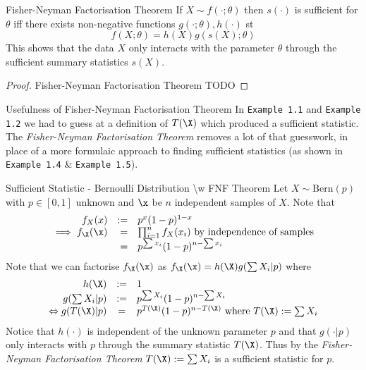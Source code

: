 \documentclass[11pt,a4paper]{article}
\begin{document}
  \begin{theorem}{Fisher-Neyman Factorisation Theorem}
    If $X\sim f(\cdot;\theta)$ then $s(\cdot)$ is sufficient for $\theta$ iff there exists non-negative functions $g(\cdot;\theta),h(\cdot)$ st
    \[ f(X;\theta)=h(X)g(s(X);\theta) \]
    This shows that the data $X$ only interacts with the parameter $\theta$ through the sufficient summary statistics $s(X)$.
  \end{theorem}

  \begin{proof}{Fisher-Neyman Factorisation Theorem}
    TODO
  \end{proof}

  \begin{remark}{Usefulness of Fisher-Neyman Factorisation Theorem}
    In \texttt{Example 1.1}  and \texttt{Example 1.2} we had to guess at a definition of $T(\X)$ which produced a sufficient statistic. The \textit{Fisher-Neyman Factorisation Theorem} removes a lot of that guesswork, in place of a more formulaic approach to finding sufficient statistics (as shown in \texttt{Example 1.4} \& \texttt{Example 1.5}).
  \end{remark}

  \begin{example}{Sufficient Statistic - Bernoulli Distribution {\textbackslash}w FNF Theorem}
    Let $X\sim\text{Bern}(p)$ with $p\in[0,1]$ unknown and $\x$ be $n$ independent samples of $X$. Note that
    \[\begin{array}{rrl}
      f_X(x)&:=&p^x(1-p)^{1-x}\\
      \implies f_\X(\x)&=&\prod_{i=1}^nf_X(x_i)\text{ by independence of samples}\\
      &=&p^{\sum x_i}(1-p)^{n-\sum x_i}
    \end{array}\]
    Note that we can factorise $f_\X(\x)$ as $f_\X(\x)=h(\X)g(\sum X_i|p)$ where
    \[\begin{array}{rcl}
      h(\X)&:=&1\\
      g(\sum X_i|p)&:=&p^{\sum X_i}(1-p)^{n-\sum X_i}\\
      \Leftrightarrow g(T(\X)|p)&=&p^{T(\X)}(1-p)^{n-T(\X)}\text{ where }T(\X):=\sum X_i
    \end{array}\]
    Notice that $h(\cdot)$ is independent of the unknown parameter $p$ and that $g(\cdot|p)$ only interacts with $p$ through the summary statistic $T(\X)$. Thus by the \textit{Fisher-Neyman Factorisation Theorem} $T(\X):=\sum X_i$ is a sufficient statistic for $p$.
  \end{example}
\end{document}

